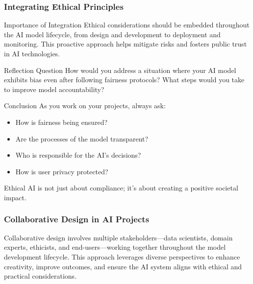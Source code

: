 \documentclass[aspectratio=169]{beamer}
\begin{document}
\begin{frame}[fragile]
    \frametitle{Integrating Ethical Principles}
    \begin{block}{Importance of Integration}
        Ethical considerations should be embedded throughout the AI model lifecycle, from design and development to deployment and monitoring. This proactive approach helps mitigate risks and fosters public trust in AI technologies.
    \end{block}

    \begin{block}{Reflection Question}
        How would you address a situation where your AI model exhibits bias even after following fairness protocols? What steps would you take to improve model accountability?
    \end{block}

    \begin{block}{Conclusion}
        As you work on your projects, always ask:
        \begin{itemize}
            \item How is fairness being ensured?
            \item Are the processes of the model transparent?
            \item Who is responsible for the AI's decisions?
            \item How is user privacy protected?
        \end{itemize}
        Ethical AI is not just about compliance; it's about creating a positive societal impact.
    \end{block}
\end{frame}

\begin{frame}[fragile]
    \frametitle{Collaborative Design in AI Projects}
    Collaborative design involves multiple stakeholders—data scientists, domain experts, ethicists, and end-users—working together throughout the model development lifecycle. This approach leverages diverse perspectives to enhance creativity, improve outcomes, and ensure the AI system aligns with ethical and practical considerations.
\end{frame}
\end{document}
